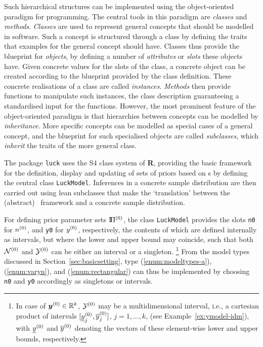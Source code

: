 Such hierarchical structures 
can be implemented using the object-oriented paradigm for programming.
The central tools in this paradigm are \emph{classes} and \emph{methods}.
\emph{Classes} are used to represent general concepts that should be modelled in software.
Such a concept is structured through a class by defining the traits that
examples for the general concept should have. 
Classes thus provide the blueprint for \emph{objects},
by defining a number of \emph{attributes} or \emph{slots} these objects have.
Given concrete values for the slots of the class,
a concrete object can be created according to the blueprint provided by the class definition.
These concrete realisations of a class are called \emph{instances}.
\emph{Methods} then provide functions to manipulate such instances,
the class description guaranteeing a standardised input for the functions.
However, the most prominent feature of the object-oriented paradigm is
that hierarchies between concepts can be modelled by \emph{inheritance}.
More specific concepts can be modelled as special cases of a general concept, %
and the blueprint for such specialised objects are called \emph{subclasses},
which \emph{inherit} the traits of the more general class.

The package \texttt{luck} uses the S4 class system of
\textbf{R}, providing the basic framework for the definition, display and updating of
sets of priors based on \model s by defining the central class \texttt{LuckModel}.
Inferences in a concrete sample distribution are then carried out
using lean subclasses that make the `translation'
between the (abstract) \model\ framework and a concrete sample distribution.

For defining prior parameter sets $\text{I}\!\Pi^{(0)}$,
the class \texttt{LuckModel} provides the slots \texttt{n0} for $n^{(0)}$, and \texttt{y0} for $y^{(0)}$, respectively,
the contents of which are defined internally as intervals,
but where the lower and upper bound may coincide,
such that both $\mathcal{N}^{(0)}$ and $\mathcal{Y}^{(0)}$ can be either an interval or a singleton.%
\footnote{In case of ${\bm y}^{(0)} \in \mathbb{R}^k$, $\mathcal{Y}^{(0)}$ may be a multidimensional interval,
i.e., a cartesian product of intervals $[\underline{y}^{(0)}_j,\overline{y}^{(0)}_j]$, $j=1,\ldots,k$,
(see Example~\ref{ex:ymodel-idm}),
with $\underline{y}^{(0)}$ and $\overline{y}^{(0)}$ denoting the vectors of these element-wise lower and upper bounds, respectively.} 
From the model types discussed in Section~\ref{sec:basicsetting}, type
(\ref{enum:modeltypes-a}), (\ref{enum:varyn}), and (\ref{enum:rectangular})
can thus be implemented by choosing \texttt{n0} and \texttt{y0} accordingly
as singletons or intervals.

